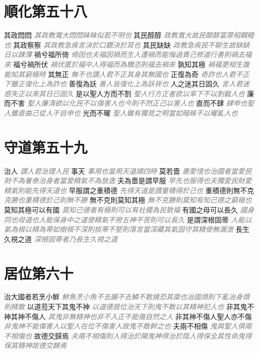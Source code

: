 \documentclass[a4paper,zihao=-4,oneside,landscape,UTF8]{ctexart}
\newcommand{\zhushi}[1]{\scriptsize{\textit{\textcolor{gray}{#1}}}\normalsize}
\begin{document}
\section{順化第五十八}

其政悶悶
\zhushi{其政教寬大悶悶昧昧似若不明也}
其民醇醇
\zhushi{政教寬大故民醇醇富厚相親睦也}
其政察察
\zhushi{其政教急疾言決於口聽決於耳也}
其民缺缺
\zhushi{政教急疾民不聊生故缺缺日以踈薄}
禍兮福所倚
\zhushi{倚因也夫福因禍而生人遭禍而能悔過責己修道行善則禍去福來}
福兮禍所伏
\zhushi{禍伏匿於福中人得福而為驕恣則福去禍來}
孰知其極
\zhushi{禍福更相生誰能知其窮極時}
其無正
\zhushi{無不也謂人君不正其身其無國也}
正復為奇
\zhushi{奇詐也人君不正下雖正復化上為詐也}
善復為訞
\zhushi{善人皆復化上為訞祥也}
人之迷其日固久
\zhushi{言人君迷惑失正以來其日已固久}
是以聖人方而不割
\zhushi{聖人行方正者欲以率下不以割截人也}
廉而不害
\zhushi{聖人廉清欲以化民不以傷害人也今則不然正己以害人也}
直而不肆
\zhushi{肆申也聖人雖直曲己從人不自申也}
光而不曜
\zhushi{聖人雖有獨見之明當如暗昧不以曜亂人也}


\section{守道第五十九}

治人
\zhushi{謂人君治理人民}
事天
\zhushi{事用也當用天道順四時}
莫若嗇
\zhushi{嗇愛惜也治國者當愛民財不為奢泰治身者當愛精氣不為放逸}
夫為嗇是謂早服
\zhushi{早先也服得也夫獨愛民財愛精氣則能先得天道也}
早服謂之重積德
\zhushi{先得天道是謂重積得於己也}
重積德則無不克
\zhushi{克勝也重積德於己則無不勝}
無不克則莫知其極
\zhushi{無不克勝則莫知有知己德之窮極也}
莫知其極可以有國
\zhushi{莫知己德者有極則可以有社稷為民致福}
有國之母可以長久
\zhushi{國身同也母道也人能保身中之道使精氣不勞五神不苦則可以長久}
是謂深根固蒂
\zhushi{人能以氣為根以精為蒂如樹根不深則拔蒂不堅則落言當深藏其氣固守其精使無漏泄}
長生久視之道
\zhushi{深根固蒂者乃長生久視之道}


\section{居位第六十}

治大國者若烹小鮮
\zhushi{鮮魚烹小魚不去腸不去鱗不敢撓恐其糜也治國煩則下亂治身煩則精散}
以道蒞天下其鬼不神
\zhushi{以道德居位治天下則鬼不敢以其精神犯人也}
非其鬼不神其神不傷人
\zhushi{其鬼非無精神也非不入正不能傷自然之人}
非其神不傷人聖人亦不傷
\zhushi{非鬼神不能傷害人以聖人在位不傷害人故鬼不敢幹之也}
夫兩不相傷
\zhushi{鬼與聖人俱兩不相傷也}
故德交歸焉
\zhushi{夫兩不相傷則人得治於陽鬼神得治於陰人得保全其性命鬼得保其精神故德交歸焉}
\end{document}
